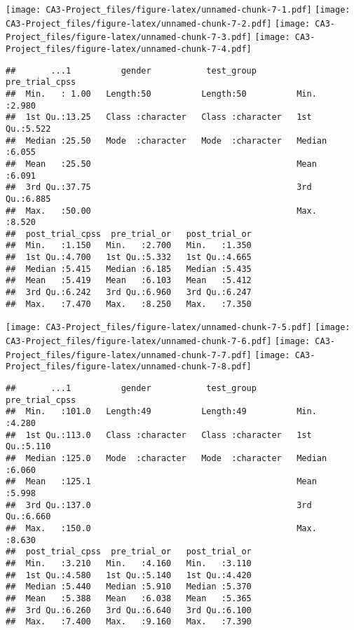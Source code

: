 \documentclass[
]{article}
\begin{document}
\texttt{[image: CA3-Project\_files/figure-latex/unnamed-chunk-7-1.pdf]}
\texttt{[image: CA3-Project\_files/figure-latex/unnamed-chunk-7-2.pdf]}
\texttt{[image: CA3-Project\_files/figure-latex/unnamed-chunk-7-3.pdf]}
\texttt{[image: CA3-Project\_files/figure-latex/unnamed-chunk-7-4.pdf]}

\begin{verbatim}
##       ...1          gender           test_group        pre_trial_cpss 
##  Min.   : 1.00   Length:50          Length:50          Min.   :2.980  
##  1st Qu.:13.25   Class :character   Class :character   1st Qu.:5.522  
##  Median :25.50   Mode  :character   Mode  :character   Median :6.055  
##  Mean   :25.50                                         Mean   :6.091  
##  3rd Qu.:37.75                                         3rd Qu.:6.885  
##  Max.   :50.00                                         Max.   :8.520  
##  post_trial_cpss  pre_trial_or   post_trial_or  
##  Min.   :1.150   Min.   :2.700   Min.   :1.350  
##  1st Qu.:4.700   1st Qu.:5.332   1st Qu.:4.665  
##  Median :5.415   Median :6.185   Median :5.435  
##  Mean   :5.419   Mean   :6.103   Mean   :5.412  
##  3rd Qu.:6.242   3rd Qu.:6.960   3rd Qu.:6.247  
##  Max.   :7.470   Max.   :8.250   Max.   :7.350
\end{verbatim}

\texttt{[image: CA3-Project\_files/figure-latex/unnamed-chunk-7-5.pdf]}
\texttt{[image: CA3-Project\_files/figure-latex/unnamed-chunk-7-6.pdf]}
\texttt{[image: CA3-Project\_files/figure-latex/unnamed-chunk-7-7.pdf]}
\texttt{[image: CA3-Project\_files/figure-latex/unnamed-chunk-7-8.pdf]}

\begin{verbatim}
##       ...1          gender           test_group        pre_trial_cpss 
##  Min.   :101.0   Length:49          Length:49          Min.   :4.280  
##  1st Qu.:113.0   Class :character   Class :character   1st Qu.:5.110  
##  Median :125.0   Mode  :character   Mode  :character   Median :6.060  
##  Mean   :125.1                                         Mean   :5.998  
##  3rd Qu.:137.0                                         3rd Qu.:6.660  
##  Max.   :150.0                                         Max.   :8.630  
##  post_trial_cpss  pre_trial_or   post_trial_or  
##  Min.   :3.210   Min.   :4.160   Min.   :3.110  
##  1st Qu.:4.580   1st Qu.:5.140   1st Qu.:4.420  
##  Median :5.440   Median :5.910   Median :5.370  
##  Mean   :5.388   Mean   :6.038   Mean   :5.365  
##  3rd Qu.:6.260   3rd Qu.:6.640   3rd Qu.:6.100  
##  Max.   :7.400   Max.   :9.160   Max.   :7.390
\end{verbatim}
\end{document}
